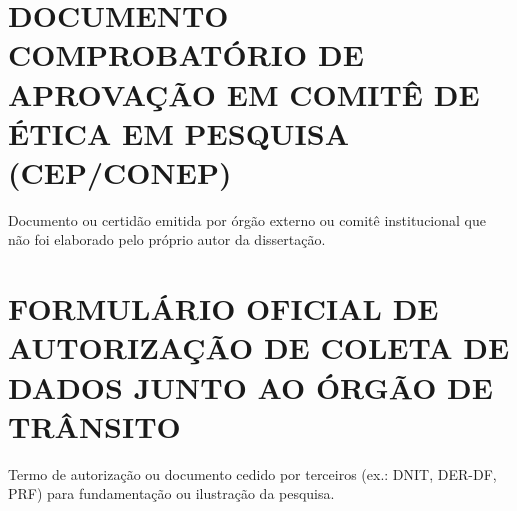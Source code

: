 \anexos

\chapter{DOCUMENTO COMPROBATÓRIO DE APROVAÇÃO EM COMITÊ DE ÉTICA EM PESQUISA (CEP/CONEP)}
\label{anexo:comite_etica}

Documento ou certidão emitida por órgão externo ou comitê institucional que não foi elaborado pelo próprio autor da dissertação.

\chapter{FORMULÁRIO OFICIAL DE AUTORIZAÇÃO DE COLETA DE DADOS JUNTO AO ÓRGÃO DE TRÂNSITO}
\label{anexo:autorizacao_orgao}

Termo de autorização ou documento cedido por terceiros (ex.: DNIT, DER-DF, PRF) para fundamentação ou ilustração da pesquisa.
